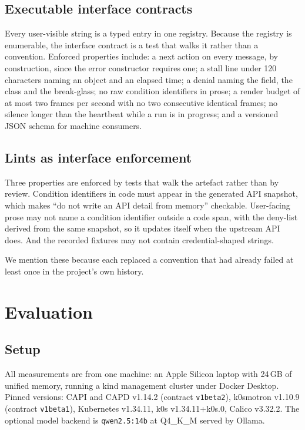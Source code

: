 \documentclass[conference]{IEEEtran}
\begin{document}
\subsection{Executable interface contracts}

Every user-visible string is a typed entry in one registry. Because the registry
is enumerable, the interface contract is a test that walks it rather than a
convention. Enforced properties include: a next action on every message, by
construction, since the error constructor requires one; a stall line under 120
characters naming an object and an elapsed time; a denial naming the field, the
class and the break-glass; no raw condition identifiers in prose; a render budget
of at most two frames per second with no two consecutive identical frames; no
silence longer than the heartbeat while a run is in progress; and a versioned JSON
schema for machine consumers.

\subsection{Lints as interface enforcement}

Three properties are enforced by tests that walk the artefact rather than by
review. Condition identifiers in code must appear in the generated API snapshot,
which makes ``do not write an API detail from memory'' checkable. User-facing prose
may not name a condition identifier outside a code span, with the deny-list derived
from the same snapshot, so it updates itself when the upstream API does. And the
recorded fixtures may not contain credential-shaped strings.

We mention these because each replaced a convention that had already failed at
least once in the project's own history.

\section{Evaluation}

\subsection{Setup}

All measurements are from one machine: an Apple Silicon laptop with 24\,GB of
unified memory, running a kind management cluster under Docker Desktop. Pinned
versions: CAPI and CAPD v1.14.2 (contract \texttt{v1beta2}), k0smotron v1.10.9
(contract \texttt{v1beta1}), Kubernetes v1.34.11, k0s v1.34.11+k0s.0, Calico
v3.32.2. The optional model backend is \texttt{qwen2.5:14b} at Q4\_K\_M served by
Ollama.
\end{document}
